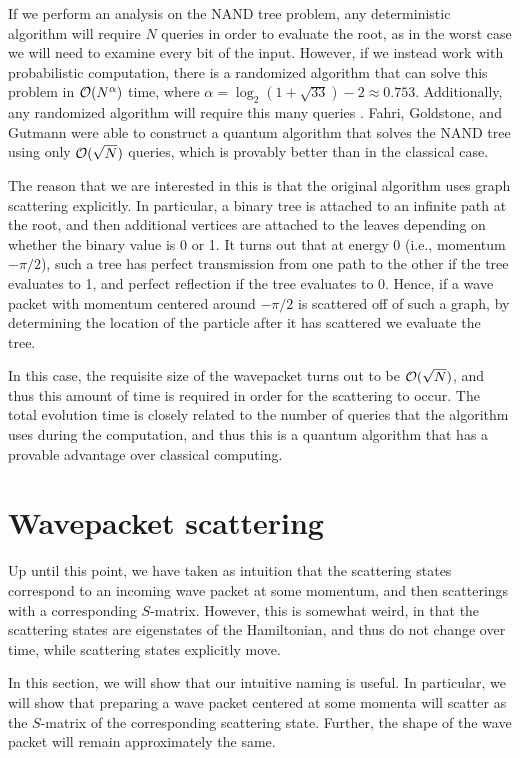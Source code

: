 \documentclass[../thesis-main/thesis-main]{subfiles}
\begin{document}
If we perform an analysis on the NAND tree problem, any deterministic algorithm will require $N$ queries in order to evaluate the root, as in the worst case we will need to examine every bit of the input.  However, if we instead work with probabilistic computation, there is a randomized algorithm \cite{SW86} that can solve this problem in $\mathcal{O}(N^\alpha)$ time, where $\alpha = \log_2(1 + \sqrt{33}) - 2 \approx 0.753$.  Additionally, any randomized algorithm will require this many queries \cite{San95}.  Fahri, Goldstone, and Gutmann were able to construct a quantum algorithm that solves the NAND tree using only $\mathcal{O}(\sqrt{N})$ queries, which is provably better than in the classical case.

The reason that we are interested in this is that the original algorithm uses graph scattering explicitly.  In particular, a binary tree is attached to an infinite path at the root, and then additional vertices are attached to the leaves depending on whether the binary value is 0 or 1.  It turns out that at energy 0 (i.e., momentum $-\pi/2$), such a tree has perfect transmission from one path to the other if the tree evaluates to 1, and perfect reflection if the tree evaluates to 0.  Hence, if a wave packet with momentum centered around $-\pi/2$ is scattered off of such a graph, by determining the location of the particle after it has scattered we evaluate the tree. 

In this case, the requisite size of the wavepacket turns out to be $\mathcal{O}(\sqrt{N})$, and thus this amount of time is required in order for the scattering to occur.  The total evolution time is closely related to the number of queries that the algorithm uses during the computation, and thus this is a quantum algorithm that has a provable advantage over classical computing.


\section{Wavepacket scattering}

Up until this point, we have taken as intuition that the scattering states correspond to an incoming wave packet at some momentum, and then scatterings with a corresponding $S$-matrix.  However, this is somewhat weird, in that the scattering states are eigenstates of the Hamiltonian, and thus do not change over time, while scattering states explicitly move.  

In this section, we will show that our intuitive naming is useful.  In particular, we will show that preparing a wave packet centered at some momenta will scatter as the $S$-matrix of the corresponding scattering state.  Further, the shape of the wave packet will remain approximately the same.
\end{document}
